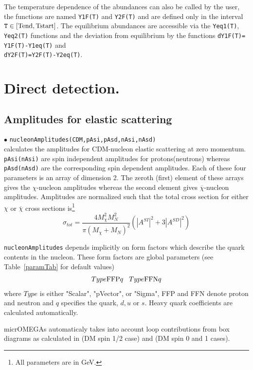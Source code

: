 \documentclass[12pt,a4paper]{article}
\begin{document}
The  temperature dependence  of the abundances can also be called by the user, the functions are named {\tt Y1F(T)} and {\tt Y2F(T)} and are defined only in the  interval ${\tt T}\in
[\rm{Tend},\rm{Tstart}]$. The equilibrium abundances are accessible via  the  { \tt Yeq1(T)}, { \tt Yeq2(T)} functions and the deviation from equilibrium  
by the functions
 {\tt dY1F(T)= Y1F(T)-Y1eq(T)}  and \\
   { \tt dY2F(T)=Y2F(T)-Y2eq(T)}.


\section{Direct detection.}
\subsection{Amplitudes for elastic scattering}
\noindent
 $\bullet$ \verb|nucleonAmplitudes(CDM,pAsi,pAsd,nAsi,nAsd)|\\
calculates the amplitudes for CDM-nucleon elastic
scattering at zero momentum. \verb|pAsi(nAsi)| are spin
independent amplitudes for protons(neutrons) whereas
\verb|pAsd(nAsd)| are the corresponding spin dependent amplitudes.
Each of these four parameters is an array of 
dimension 2. The zeroth (first) element of these arrays gives the
$\chi$-nucleon amplitudes whereas the second element gives
$\overline{\chi}$-nucleon amplitudes. Amplitudes are normalized
such that the total cross section for either $\chi$ or $\overline
\chi$ cross sections is\footnote{All parameters are in GeV.}
\begin{equation}
\sigma_{tot}=\frac{4M_{\chi}^2 M_N^2}{\pi(M_{\chi}+M_N)^2}(|A^{SI}|^2+3|A^{SD}|^2)
\label{eq:norm}
\end{equation}

\verb|nucleonAmplitudes| depends implicitly on form factors which describe the 
quark contents in the nucleon. These form factors are global parameters (see
Table~\ref{paramTab} for
default values)
\begin{equation}
Type{\rm FFP}q \;\;\; Type{\rm FFN}q \nonumber
\end{equation} 
where $Type$ is either "Scalar", "pVector", or "Sigma",  FFP and FFN denote proton and neutron  and
$q$ specifies the quark, $d,u$  or $s$. Heavy quark coefficients are calculated automatically.

micrOMEGAs automaticaly takes into account loop contributions  from box
diagrams as calculated in \cite{Drees:1993bu} (DM spin 1/2 case) and \cite{Hisano:2015bma}
(DM spin 0 and 1 cases).
\end{document}

